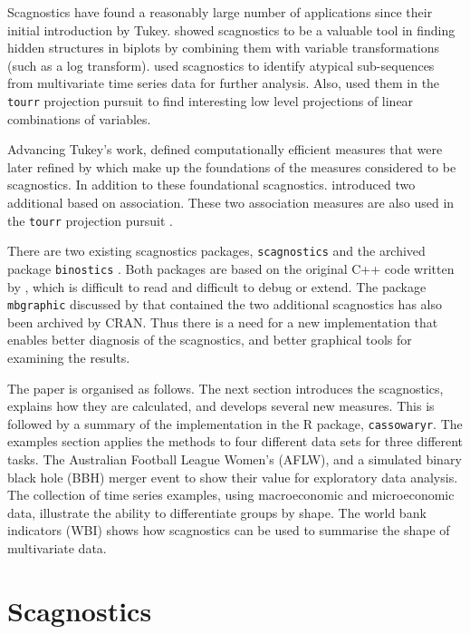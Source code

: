 Scagnostics have found a reasonably large number of applications since
their initial introduction by Tukey. \citet{hidscags} showed scagnostics
to be a valuable tool in finding hidden structures in biplots by
combining them with variable transformations (such as a log transform).
\citet{timeseer} used scagnostics to identify atypical sub-sequences
from multivariate time series data for further analysis. Also,
\citet{tourrpp} used them in the \texttt{tourr} projection pursuit to
find interesting low level projections of linear combinations of
variables.

Advancing Tukey's work, \citet{scag} defined computationally efficient
measures that were later refined by \citet{scagdist} which make up the
foundations of the measures considered to be scagnostics. In addition to
these foundational scagnostics. \citet{Grimm} introduced two additional
based on association. These two association measures are also used in
the \texttt{tourr} projection pursuit \citep{tourrpp}.

There are two existing scagnostics packages, \texttt{scagnostics}
\citep{scagdist} and the archived package \texttt{binostics}
\citep{binostics}. Both packages are based on the original C++ code
written by \citet{scagdist}, which is difficult to read and difficult to
debug or extend. The package \texttt{mbgraphic} discussed by
\citet{Grimm} that contained the two additional scagnostics has also
been archived by CRAN. Thus there is a need for a new implementation
that enables better diagnosis of the scagnostics, and better graphical
tools for examining the results.

The paper is organised as follows. The next section introduces the
scagnostics, explains how they are calculated, and develops several new
measures. This is followed by a summary of the implementation in the R
package, \texttt{cassowaryr}. The examples section applies the methods
to four different data sets for three different tasks. The Australian
Football League Women's (AFLW), and a simulated binary black hole (BBH)
merger event to show their value for exploratory data analysis. The
collection of time series examples, using macroeconomic and
microeconomic data, illustrate the ability to differentiate groups by
shape. The world bank indicators (WBI) shows how scagnostics can be used
to summarise the shape of multivariate data.

\hypertarget{scagnostics}{%
\section{Scagnostics}\label{scagnostics}}

